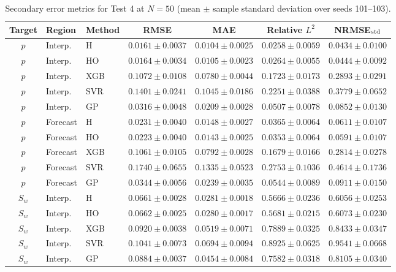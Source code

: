 \begin{table}[t]
\centering
\scriptsize
\setlength{\tabcolsep}{2.7pt}
\caption{Secondary error metrics for Test 4 at $N=50$ (mean $\pm$ sample standard deviation over seeds 101--103).}
\label{tab:secondary_test4}
\begin{tabular}{@{}cllcccc@{}}
\toprule
Target & Region & Method & RMSE & MAE & Relative $L^2$ & NRMSE$_{\rm std}$ \\
\midrule
$p$ & Interp. & H & $0.0161\pm0.0037$ & $0.0104\pm0.0025$ & $0.0258\pm0.0059$ & $0.0434\pm0.0100$ \\
$p$ & Interp. & HO & $0.0164\pm0.0034$ & $0.0105\pm0.0023$ & $0.0264\pm0.0055$ & $0.0444\pm0.0092$ \\
$p$ & Interp. & XGB & $0.1072\pm0.0108$ & $0.0780\pm0.0044$ & $0.1723\pm0.0173$ & $0.2893\pm0.0291$ \\
$p$ & Interp. & SVR & $0.1401\pm0.0241$ & $0.1045\pm0.0186$ & $0.2251\pm0.0388$ & $0.3779\pm0.0652$ \\
$p$ & Interp. & GP & $0.0316\pm0.0048$ & $0.0209\pm0.0028$ & $0.0507\pm0.0078$ & $0.0852\pm0.0130$ \\
\addlinespace[1pt]
$p$ & Forecast & H & $0.0231\pm0.0040$ & $0.0148\pm0.0027$ & $0.0365\pm0.0064$ & $0.0611\pm0.0107$ \\
$p$ & Forecast & HO & $0.0223\pm0.0040$ & $0.0143\pm0.0025$ & $0.0353\pm0.0064$ & $0.0591\pm0.0107$ \\
$p$ & Forecast & XGB & $0.1061\pm0.0105$ & $0.0792\pm0.0028$ & $0.1679\pm0.0166$ & $0.2814\pm0.0278$ \\
$p$ & Forecast & SVR & $0.1740\pm0.0655$ & $0.1335\pm0.0523$ & $0.2753\pm0.1036$ & $0.4614\pm0.1736$ \\
$p$ & Forecast & GP & $0.0344\pm0.0056$ & $0.0239\pm0.0035$ & $0.0544\pm0.0089$ & $0.0911\pm0.0150$ \\
\addlinespace[1pt]
\midrule
$S_w$ & Interp. & H & $0.0661\pm0.0028$ & $0.0281\pm0.0018$ & $0.5666\pm0.0236$ & $0.6056\pm0.0253$ \\
$S_w$ & Interp. & HO & $0.0662\pm0.0025$ & $0.0280\pm0.0017$ & $0.5681\pm0.0215$ & $0.6073\pm0.0230$ \\
$S_w$ & Interp. & XGB & $0.0920\pm0.0038$ & $0.0519\pm0.0071$ & $0.7889\pm0.0325$ & $0.8433\pm0.0347$ \\
$S_w$ & Interp. & SVR & $0.1041\pm0.0073$ & $0.0694\pm0.0094$ & $0.8925\pm0.0625$ & $0.9541\pm0.0668$ \\
$S_w$ & Interp. & GP & $0.0884\pm0.0037$ & $0.0454\pm0.0084$ & $0.7582\pm0.0318$ & $0.8105\pm0.0340$ \\

\end{tabular}
\end{table}
